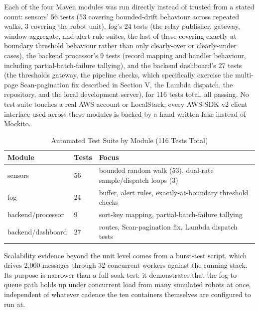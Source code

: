 \documentclass[conference]{IEEEtran}
\begin{document}
Each of the four Maven modules was run directly instead of trusted from a stated count: sensors' 56 tests (53 covering bounded-drift behaviour across repeated walks, 3 covering the robot unit), fog's 24 tests (the relay publisher, gateway, window aggregate, and alert-rule suites, the last of these covering exactly-at-boundary threshold behaviour rather than only clearly-over or clearly-under cases), the backend processor's 9 tests (record mapping and handler behaviour, including partial-batch-failure tallying), and the backend dashboard's 27 tests (the thresholds gateway, the pipeline checks, which specifically exercise the multi-page Scan-pagination fix described in Section V, the Lambda dispatch, the repository, and the local development server), for 116 tests total, all passing. No test suite touches a real AWS account or LocalStack; every AWS SDK v2 client interface used across these modules is backed by a hand-written fake instead of Mockito.

\begin{table}[!t]
\caption{Automated Test Suite by Module (116 Tests Total)}
\label{tab:tests}
\centering
\footnotesize
\begin{tabular}{|>{\raggedright\arraybackslash}p{1.75cm}|p{0.7cm}|>{\raggedright\arraybackslash}p{4.45cm}|}
\hline
\textbf{Module} & \textbf{Tests} & \textbf{Focus} \\
\hline
sensors & 56 & bounded random walk (53), dual-rate sample/dispatch loops (3) \\
\hline
fog & 24 & buffer, alert rules, exactly-at-boundary threshold checks \\
\hline
backend/processor & 9 & sort-key mapping, partial-batch-failure tallying \\
\hline
backend/dashboard & 27 & routes, Scan-pagination fix, Lambda dispatch tests \\
\hline
\end{tabular}
\end{table}

Scalability evidence beyond the unit level comes from a burst-test script, which drives 2,000 messages through 32 concurrent workers against the running stack. Its purpose is narrower than a full soak test: it demonstrates that the fog-to-queue path holds up under concurrent load from many simulated robots at once, independent of whatever cadence the ten containers themselves are configured to run at.
\end{document}
